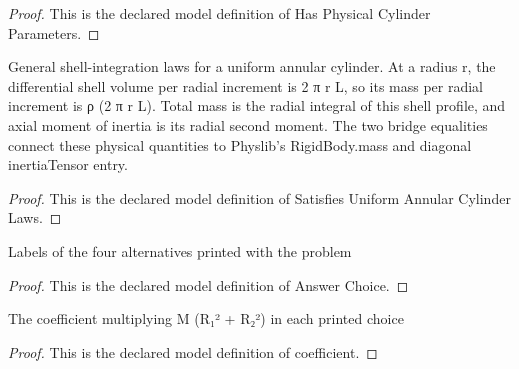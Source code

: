 \begin{proof}
  This is the declared model definition of Has Physical Cylinder Parameters.
\end{proof}
\begin{definition}
  \label{def:physics:phyx-mini-0822:phyxminiproblems-problemphyxmini0822-satisfiesuniformannularcylinderlaws}
  General shell-integration laws for a uniform annular cylinder. At a radius r, the differential shell volume per radial increment is 2 π r L, so its mass per radial increment is ρ (2 π r L). Total mass is the radial integral of this shell profile, and axial moment of inertia is its radial second moment. The two bridge equalities connect these physical quantities to Physlib's RigidBody.mass and diagonal inertiaTensor entry.
\end{definition}
\begin{proof}
  This is the declared model definition of Satisfies Uniform Annular Cylinder Laws.
\end{proof}
\begin{definition}
  \label{def:physics:phyx-mini-0822:phyxminiproblems-problemphyxmini0822-answerchoice}
  Labels of the four alternatives printed with the problem
\end{definition}
\begin{proof}
  This is the declared model definition of Answer Choice.
\end{proof}
\begin{definition}[coefficient]
  \label{def:physics:phyx-mini-0822:phyxminiproblems-problemphyxmini0822-answerchoice-coefficient}
  The coefficient multiplying M (R₁² + R₂²) in each printed choice
\end{definition}
\begin{proof}
  This is the declared model definition of coefficient.
\end{proof}
